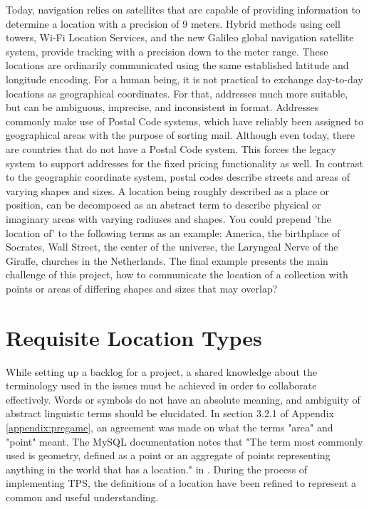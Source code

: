 Today, navigation relies on satellites that are capable of providing information to determine a location with a precision of 9 meters. Hybrid methods using cell towers, Wi-Fi Location Services, and the new Galileo global navigation satellite system, provide tracking with a precision down to the meter range. These locations are ordinarily communicated using the same established latitude and longitude encoding. For a human being, it is not practical to exchange day-to-day locations as geographical coordinates. For that, addresses much more suitable, but can be ambiguous, imprecise, and inconsistent in format. Addresses commonly make use of Postal Code systems, which have reliably been assigned to geographical areas with the purpose of sorting mail. Although even today, there are countries that do not have a Postal Code system. This forces the legacy system to support addresses for the fixed pricing functionality as well. In contrast to the geographic coordinate system, postal codes describe streets and areas of varying shapes and sizes. A location being roughly described as a place or position, can be decomposed as an abstract term to describe physical or imaginary areas with varying radiuses and shapes. You could prepend 'the location of' to the following terms as an example: America, the birthplace of Socrates, Wall Street, the center of the universe, the Laryngeal Nerve of the Giraffe, churches in the Netherlands. The final example presents the main challenge of this project, how to communicate the location of a collection with points or areas of differing shapes and sizes that may overlap?

%
\section{Requisite Location Types}
While setting up a backlog for a project, a shared knowledge about the terminology used in the issues must be achieved in order to collaborate effectively. Words or symbols do not have an absolute meaning, and ambiguity of abstract linguistic terms should be elucidated. In section 3.2.1 of Appendix \ref{appendix:pregame}, an agreement was made on what the terms "area" and "point" meant. The MySQL documentation notes that "The term most commonly used is geometry, defined as a point or an aggregate of points representing anything in the world that has a location." in \cite{MySQL-Spat}. During the process of implementing TPS, the definitions of a location have been refined to represent a common and useful understanding.

